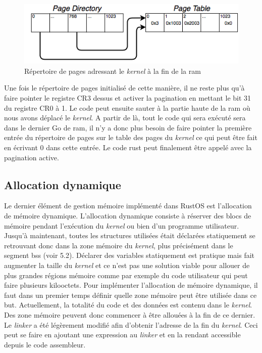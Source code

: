 \begin{figure}[!h]
  \centering
  \includegraphics[scale=0.65]{images/high_kern_pd.png}
  \caption{Répertoire de pages adressant le \textit{kernel} à la fin de la \acrshort{ram}}
  \label{high_kern_pd}
\end{figure}

Une fois le répertoire de pages initialisé de cette manière, il ne reste plus
qu'à faire pointer le registre CR3 dessus et activer la pagination en mettant
le bit 31 du registre CR0 à 1. Le code peut ensuite sauter à la partie haute de
la \acrshort{ram} où nous avons déplacé le \textit{kernel}. A partir de là,
tout le code qui sera exécuté sera dans le dernier Go de \acrshort{ram}, il n'y
a donc plus besoin de faire pointer la première entrée du répertoire de pages
sur le table des pages du \textit{kernel} ce qui peut être fait en écrivant 0
dans cette entrée. Le code rust peut finalement être appelé avec la pagination
active.


\subsection{Allocation dynamique}
Le dernier élément de gestion mémoire implémenté dans RustOS est l'allocation de
mémoire dynamique. L'allocation dynamique consiste à réserver des blocs de mémoire
pendant l'exécution du \textit{kernel} ou bien d'un programme utilisateur. Jusqu'à
maintenant, toutes les structures utilisées était déclarées statiquement se retrouvant
donc dans la zone mémoire du \textit{kernel}, plus précisément dans le segment
bss (voir 5.2). Déclarer des variables statiquement est pratique mais fait
augmenter la taille du \textit{kernel} et ce n'est pas une solution viable
pour allouer de plus grandes régions mémoire comme par exemple du code utilisateur
qui peut faire plusieurs kilooctets. Pour implémenter l'allocation de mémoire
dynamique, il faut dans un premier temps définir quelle zone mémoire peut être
utilisée dans ce but. Actuellement, la totalité du code et des données est contenu
dans le \textit{kernel}. Des zone mémoire peuvent donc commencer à être allouées
à la fin de ce dernier. Le \textit{linker} a été légèrement modifié afin d'obtenir
l'adresse de la fin du \textit{kernel}. Ceci peut se faire en ajoutant une expression
au \textit{linker} et en la rendant accessible depuis le code assembleur. \\

